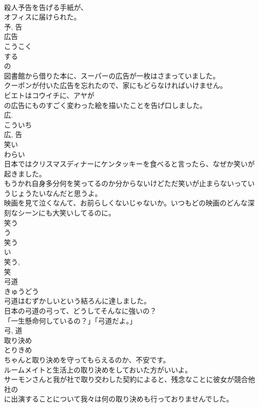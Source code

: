 \documentclass[8pt]{extreport}
\begin{document}
\begin{CJK}{UTF8}{min}
\\	殺人予告を告げる手紙が、
\\	オフィスに届けられた。	
\\	予, 告	
\\	広告	
\\	こうこく	
\\	する 
\\	の 
\\	図書館から借りた本に、スーパーの広告が一枚はさまっていました。	
\\	クーポンが付いた広告を忘れたので、家にもどらなければいけません。	
\\	ビエトはコウイチに、アヤが
\\	の広告にものすごく変わった絵を描いたことを告げ口しました。	
\\	広. 
\\	こういち 
\\	広, 告	
\\	笑い	
\\	わらい	
\\	日本ではクリスマスディナーにケンタッキーを食べると言ったら、なぜか笑いが起きました。	
\\	もうかれ自身多分何を笑ってるのか分からないけどただ笑いが止まらないっていうじょうたいなんだと思うよ。	
\\	映画を見て泣くなんて、お前らしくないじゃないか。いつもどの映画のどんな深刻なシーンにも大笑いしてるのに。	
\\	笑う 
\\	う 
\\	笑う 
\\	い 
\\	笑う, 
\\	笑	
\\	弓道	
\\	きゅうどう	
\\	弓道はむずかしいという結ろんに達しました。	
\\	日本の弓道の弓って、どうしてそんなに強いの？	
\\	「一生懸命何しているの？」「弓道だよ。」	
\\	弓, 道	
\\	取り決め	
\\	とりきめ	
\\	ちゃんと取り決めを守ってもらえるのか、不安です。	
\\	ルームメイトと生活上の取り決めをしておいた方がいいよ。	
\\	サーモンさんと我が社で取り交わした契約によると、残念なことに彼女が競合他社の
\\	に出演することについて我々は何の取り決めも行っておりませんでした。	

\end{CJK}
\end{document}
